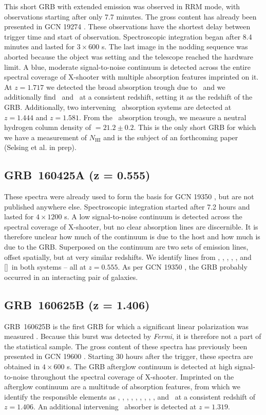 \documentclass[longauth]{aa}    %
\begin{document}
This short GRB with extended emission \citep[GCN 19276;][]{GCN19276} was
observed in RRM mode, with observations starting after only 7.7 minutes. The
gross content has already been presented in GCN 19274 \citep{GCN19274}. These
observations have the shortest delay between trigger time and start of
observation. Spectroscopic integration began after 8.4 minutes and lasted for $3
\times 600$ s. The last image in the nodding sequence was aborted because the
object was setting and the telescope reached the hardware limit. A blue,
moderate signal-to-noise continuum is detected across the entire spectral
coverage of X-shooter with multiple absorption features imprinted on it. At $z =
1.717$ we detected the broad absorption trough due to \lya~and we additionally
find \alii~and \feii~at a consistent redshift, setting it as the redshift of the
GRB. Additionally, two intervening \civ~absorption systems are detected at  $z =
1.444$ and $z = 1.581$. From the \lya~absorption trough, we measure a neutral
hydrogen column density of \nh$= 21.2 \pm 0.2$. This is the only short GRB for
which we have a measurement of $N_{\mathrm{HI}}$ and is the subject of an
forthcoming paper (Selsing et al. in prep).

\subsection{GRB~160425A (z = 0.555)}\label{160425}

These spectra were already used to form the basis for GCN 19350
\citep{GCN19350}, but are not published anywhere else. Spectroscopic integration
started after 7.2 hours and lasted for $4 \times 1200$ s. A low signal-to-noise
continuum is detected across the spectral coverage of X-shooter, but no clear
absorption lines are discernible. It is therefore unclear how much of the
continuum is due to the host and how much is due to the GRB. Superposed on the
continuum are two sets of emission lines, offset spatially, but at very similar
redshifts. We identify lines from \oii, \hb, \oiii, \ha, \niil, and [\sii]~in both
systems -- all at $z = 0.555$. As per GCN 19350 \citep{GCN19350}, the GRB
probably occurred in an interacting pair of galaxies.

\subsection{GRB~160625B (z = 1.406)}\label{160625}

GRB~160625B is the first GRB for which a significant linear polarization was
measured \citep{Troja2017}. Because this burst was detected by \textit{Fermi}, it
is therefore not a part of the statistical sample. The gross content of these
spectra has previously been presented in GCN 19600 \citep{GCN19600}. Starting 30
hours after the trigger, these spectra are obtained in $4 \times 600$ s. The GRB
afterglow continuum is detected at high signal-to-noise throughout the spectral
coverage of X-shooter. Imprinted on the afterglow continuum are a multitude of
absorption features, from which we identify the responsible elements as \SIii,
\oi, \SIiv, \civ, \alii, \aliii, \feii, \znii, \mgii, and \mgi~at a consistent
redshift of $z = 1.406$. An additional intervening \mgii~absorber is detected at
$z = 1.319$.
\end{document}
